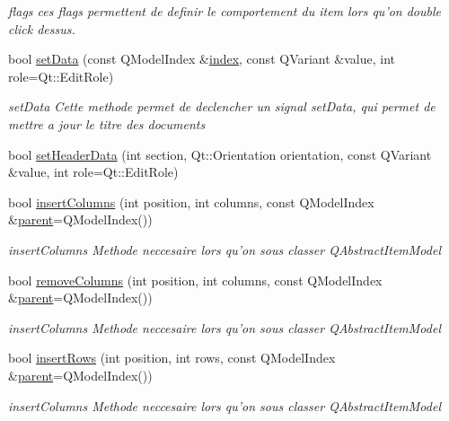 \begin{DoxyCompactItemize}
\begin{DoxyCompactList}\small\item\em flags ces flags permettent de definir le comportement du item lors qu'on double click dessus. \end{DoxyCompactList}\item 
bool \hyperlink{class_tree_model_acd3341eaa58b720ea4e6d6a415145dbd}{set\-Data} (const Q\-Model\-Index \&\hyperlink{class_tree_model_a2efaf132fe0622813075346d60129ae9}{index}, const Q\-Variant \&value, int role=Qt\-::\-Edit\-Role)
\begin{DoxyCompactList}\small\item\em set\-Data Cette methode permet de declencher un signal set\-Data, qui permet de mettre a jour le titre des documents \end{DoxyCompactList}\item 
bool \hyperlink{class_tree_model_a8d42cbbd50936e26241fb6a71ee9fb84}{set\-Header\-Data} (int section, Qt\-::\-Orientation orientation, const Q\-Variant \&value, int role=Qt\-::\-Edit\-Role)
\item 
bool \hyperlink{class_tree_model_adf2d16a207ddf05aae567da3406be5f2}{insert\-Columns} (int position, int columns, const Q\-Model\-Index \&\hyperlink{class_tree_model_a210d05503fb8758b7bad1c4fd4c5ae6b}{parent}=Q\-Model\-Index())
\begin{DoxyCompactList}\small\item\em insert\-Columns Methode neccesaire lors qu'on sous classer Q\-Abstract\-Item\-Model \end{DoxyCompactList}\item 
bool \hyperlink{class_tree_model_a12199c62570fbfb85bda45054ad7ba67}{remove\-Columns} (int position, int columns, const Q\-Model\-Index \&\hyperlink{class_tree_model_a210d05503fb8758b7bad1c4fd4c5ae6b}{parent}=Q\-Model\-Index())
\begin{DoxyCompactList}\small\item\em insert\-Columns Methode neccesaire lors qu'on sous classer Q\-Abstract\-Item\-Model \end{DoxyCompactList}\item 
bool \hyperlink{class_tree_model_a56f31919a9eb68ae229afea2257bfc35}{insert\-Rows} (int position, int rows, const Q\-Model\-Index \&\hyperlink{class_tree_model_a210d05503fb8758b7bad1c4fd4c5ae6b}{parent}=Q\-Model\-Index())
\begin{DoxyCompactList}\small\item\em insert\-Columns Methode neccesaire lors qu'on sous classer Q\-Abstract\-Item\-Model \end{DoxyCompactList}\item 

\end{DoxyCompactItemize}
